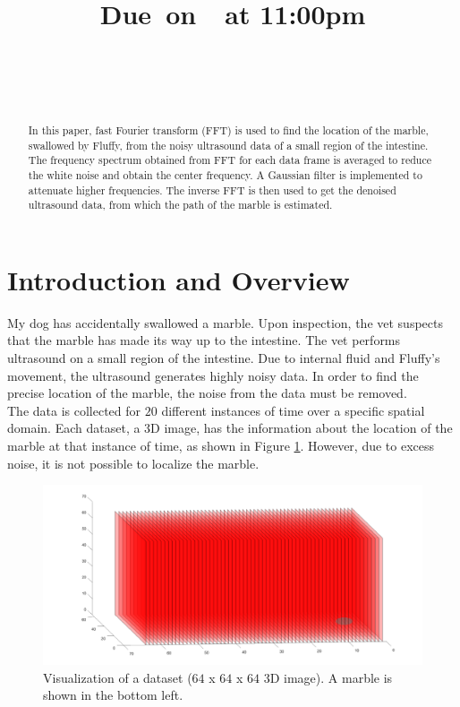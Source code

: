 \documentclass{article}
\title{
    \vspace{2in}
    \textmd{\textbf{\hmwkClass}}\\
    \vspace{0.3in}\textmd{\textbf{\hmwkTitle}}\\
    \normalsize\vspace{0.1in}\small{Due\ on\ \hmwkDueDate\ at 11:00pm}\\
    \vspace{0.1in}\large{\textit{\hmwkClassInstructor}} \\
    \vspace{0.1in}\large{{\hmwkClassSection}} \\
    \vspace{2.5in}
}
\author{\hmwkAuthorName}
\date{}
\begin{document}
\maketitle
\pagebreak

\begin{abstract}
 In this paper, fast Fourier transform (FFT) is used to find the location of the marble, swallowed by Fluffy, from the noisy ultrasound data of a small region of the intestine. The frequency spectrum obtained from FFT for each data frame is averaged to reduce the white noise and obtain the center frequency. A Gaussian filter is implemented to attenuate higher frequencies. The inverse FFT is then used to get the denoised ultrasound data, from which the path of the marble is estimated.
\end{abstract}

\section{Introduction and Overview}
My dog has accidentally swallowed a marble. Upon inspection, the vet suspects that the marble has made its way up to the intestine. The vet performs ultrasound on a small region of the intestine. Due to internal fluid and Fluffy's movement, the ultrasound generates highly noisy data. In order to find the precise location of the marble, the noise from the data must be removed. \\

The data is collected for $20$ different instances of time over a specific spatial domain. Each dataset, a 3D image, has the information about the location of the marble at that instance of time, as shown in Figure \ref{fig:dviz}. However, due to excess noise, it is not possible to localize the marble.

\begin{figure}[!b]
  \centering
    \includegraphics[scale=0.3]{./Figs/dataframes.png}
    \caption{Visualization of a dataset ($64$ x $64$ x $64$ 3D image). A marble is shown in the bottom left.}
  \label{fig:dviz}
\end{figure}
\end{document}
